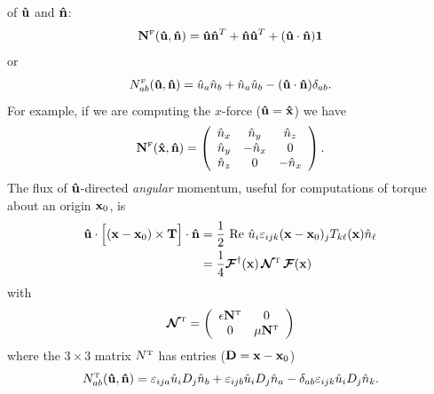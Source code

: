 \documentclass[letterpaper]{article}
\begin{document}
of $\mathbf{\hat u}$ and $\mathbf{\hat n}$:
$$ \mathbf{N}^{\hbox{\tiny{F}}}(\mathbf{\hat u}, \mathbf{\hat n})
   =  \mathbf{\hat u} \mathbf{\hat n}^T
     +\mathbf{\hat n} \mathbf{\hat u}^T
     +(\mathbf{\hat u} \cdot \mathbf{\hat n})\mathbf{1}
$$
or
$$ N^{\hbox{\tiny{F}}}_{ab}(\mathbf{\hat u}, \mathbf{\hat n}) =
   \hat{u}_{a} \hat{n}_b + \hat{n}_a \hat{u}_b 
  - (\mathbf{\hat u} \cdot \mathbf{\hat n})\delta_{ab}.
$$
For example, if we are computing the $x$-force ($\mathbf{\hat u}=\mathbf{\hat x}$)
we have 
$$ \mathbf{N}^{\hbox{\tiny{F}}}(\mathbf{\hat x}, \mathbf{\hat n})=
   \left(\begin{array}{ccc}
   \hat{n}_x & \hat n_y   & \hat n_z \\
   \hat{n}_y & -\hat{n}_x & 0 \\
   \hat{n}_z & 0          & -\hat{n}_x
  \end{array}\right).
$$
The flux of $\mathbf{\hat u}$-directed \textit{angular} momentum, useful
for computations of torque about an origin $\mathbf{x}_0$, is
\begin{align}
 \mathbf{\hat u} \cdot \Big[ (\mathbf{x}-\mathbf{x}_0) \times \mathbf{T} \Big]
 \cdot \mathbf{\hat n}
&=\frac{1}{2}
  \text{ Re }
  \hat{u}_i
  \varepsilon_{ijk}(\mathbf{x}-\mathbf{x}_0)_j T_{k\ell}(\mathbf{x}) \hat{n}_\ell
\\
&= \frac{1}{4}\boldsymbol{\mathcal{F}}^\dagger(\mathbf{x}) 
   \, \boldsymbol{\mathcal{N}}^{\hbox{\tiny{T}}} \, \boldsymbol{\mathcal{F}}(\mathbf{x})
\label{ITVMVP}
\end{align}
with 
$$
   \boldsymbol{\mathcal{N}}^{\hbox{\tiny{T}}}=
   \left(\begin{array}{cc}
   \epsilon \mathbf{N}^{\hbox{\tiny{T}}} & 0 \\
            0        & \mu \mathbf{N}^{\hbox{\tiny{T}}} 
   \end{array}\right)
$$
where the $3\times 3$ matrix $N^{\hbox{\tiny{T}}}$ has entries ($\mathbf{D}=\mathbf{x}-\mathbf{x}_0$)
$$ N^{\hbox{\tiny{T}}}_{ab}(\mathbf{\hat u}, \mathbf{\hat n})=
   \varepsilon_{ija}\hat{u}_i D_j \hat{n}_b
  +\varepsilon_{ijb}\hat{u}_i D_j \hat{n}_a
  -\delta_{ab} \varepsilon_{ijk} \hat{u}_i D_j \hat{n}_k.
$$

\end{document}
